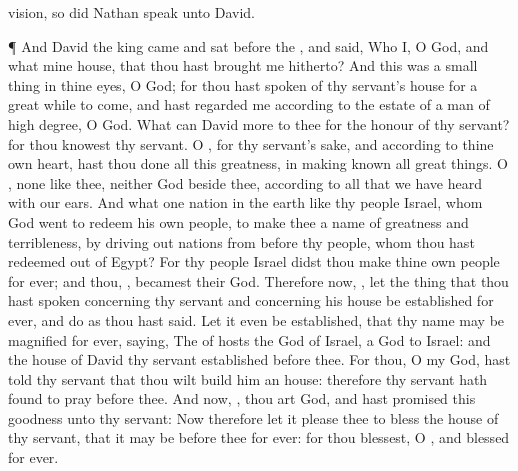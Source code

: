 {vision, so did
Nathan
speak unto
David.
\par }{\PP {}¶ And
David the
king
came and
sat
before the
{}, and
said, Who
{} I, O
{}
God, and what
{} mine
house, that thou hast
brought me
hitherto?
And
{} this was a small
thing in thine
eyes, O
God; for thou hast
{}
spoken of thy
servant’s
house for a great while to
come, and hast
regarded me according to the
estate of a
man of high
degree, O
{}
God.
What
can
David
{}
more to thee for the
honour of thy
servant? for thou
knowest thy
servant.
O
{}, for thy
servant’s sake, and according to thine own
heart, hast thou
done all this
greatness, in making
known all
{} great
things.
O
{},
{} none like thee, neither
{}
God
beside thee, according to all that we have
heard with our
ears.
And what
one
nation in the
earth
{} like thy
people
Israel, whom
God
went to
redeem
{} his own
people, to
make thee a
name of
greatness and
terribleness, by driving
out
nations from
before thy
people, whom thou hast
redeemed out of
Egypt?
For thy
people
Israel didst thou
make thine own
people
for
ever; and thou,
{}, becamest their
God.
Therefore now,
{}, let the
thing that thou hast
spoken concerning thy
servant and concerning his
house be
established
for
ever, and
do as thou hast
said.
Let it even be
established, that thy
name may be
magnified
for
ever,
saying, The
{} of
hosts
{} the
God of
Israel,
{} a
God to
Israel: and
{} the
house of
David thy
servant
{}
established
before thee.
For thou, O my
God, hast
told thy
servant that thou wilt
build him an
house: therefore thy
servant hath
found
{} to
pray
before thee.
And now,
{}, thou art
God, and hast
promised this
goodness unto thy
servant:
Now therefore let it
please thee to
bless the
house of thy
servant, that it may be
before thee for
ever: for thou
blessest, O
{}, and
{}
blessed for
ever.

}
